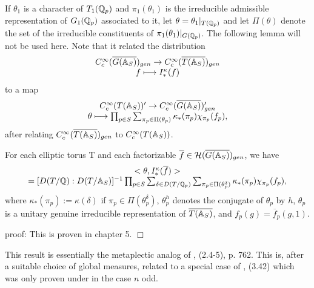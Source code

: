 If $\theta_1$ is a character
of ${T_1({\Bbb Q}_p)}$ and $\pi_1(\theta_1)$ is the
irreducible admissible representation of
${G_1({\Bbb Q}_p)}$ associated to it, let
$\theta =\theta_1|_{{T({\Bbb{Q}}_p)}}$ and let
$\Pi(\theta)$ denote the set of the irreducible
constituents of
$\pi_1(\theta_1)|_{G({\Bbb{Q}}_p)}$.
The following lemma will not be used here. Note that it related
the distribution
\[
\begin{array}{c}
C_c^\infty(\overline{G({\Bbb{A}}_S)})_{gen}
\rightarrow
C_c^\infty(\overline{T({\Bbb{A}}_S)})_{gen}\\
f\longmapsto I_*^\kappa(f)
\end{array}
\]
to a map
\[
\begin{array}{c}
C_c^\infty(T({\Bbb{A}}_S))'
\rightarrow
C_c^\infty(\overline{G({\Bbb{A}}_S)})'_{gen}\\
\theta \longmapsto
\prod_{p\in S}\sum_{\pi _p\in \Pi (\theta_p)}
\kappa _{*}(\pi _p)\chi _{\pi _p}(f_p),
\end{array}
\]
after relating $C_c^\infty(\overline{T({\Bbb{A}}_S)})_{gen}$
to $C_c^\infty(T({\Bbb{A}}_S))$.
\begin{lemma}
For each elliptic torus T and each factorizable
$\overline{f}\in {\cal{H}}(\overline{G({\Bbb{A}}_S)})_{gen}$, we have 
\[
\begin{array}{c}
<\theta ,I_{*}^\kappa (\overline{f} )> \\ 
=[D(T/{\Bbb{Q}}):D(T/{\Bbb{A}}_S)]^{-1}
\prod_{p\in S}
\sum_{\delta\in D(T/{\Bbb Q}_p)}
\sum_{\pi _p\in \Pi (\theta_p^\delta)}
\kappa _{*}(\pi _p)\chi _{\pi _p}(f_p),
\end{array}
\]
where $\kappa _{*}(\pi _p):=\kappa (\delta)$ if
$\pi _p\in \Pi (\theta_p^\delta)$,
${\theta }_p^h$ denotes the conjugate of ${\theta }_p$ by $h$,
${\theta }_p$ is a unitary genuine irreducible
representation of $\overline{T({\Bbb{A}}_S)}$, and
$f_p(g)=\overline{f}_p(g,1)$.
\end{lemma}

proof: This is proven in chapter 5. $\Box$
\begin{remark}
This result is essentially the metaplectic analog of
\cite{LL}, (2.4-5), p. 762. This is, after a suitable 
choice of global measures, related to a special case of
\cite{J}, (3.42) which was only proven under in the case $n$ odd.
\end{remark}

